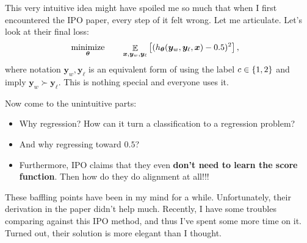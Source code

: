 \documentclass[11pt,a4paper]{article}
\begin{document}
This very intuitive idea might have spoiled me so much that when I first encountered the IPO paper, every step of it felt wrong.
Let me articulate. Let's look at their final loss:
\begin{alignat*}{2}
    & \operatorname*{\text{minimize}}_{\boldsymbol \theta} \quad && \mathop{\mathbb{E}}_{\bm{x}, \bm{y}_w, \bm{y}_{\ell }} \left[  (h_{\boldsymbol \theta}(\bm{y}_{w}, \bm{y}_{\ell }, \bm{x}) - 0.5)^2 \right],
\end{alignat*}
where notation $\bm{y}_{w}, \bm{y}_{\ell }$ is an equivalent form of using the label $c\in\left\{1,2\right\}$ and imply $\bm{y}_w \succ \bm{y}_{\ell }$. This is nothing special and everyone uses it.

Now come to the unintuitive parts:
\begin{itemize}
    \item Why regression? How can it turn a classification to a regression problem?
    \item And why regressing toward $0.5$?
    \item Furthermore, IPO claims that they even \textbf{don't need to learn the score function}. Then how do they do alignment at all!!!
\end{itemize}
These baffling points have been in my mind for a while. Unfortunately, their derivation in the paper didn't help much.
Recently, I have some troubles comparing against this IPO method, and thus I've spent some more time on it. Turned out, their solution is more elegant than I thought.



\end{document}
